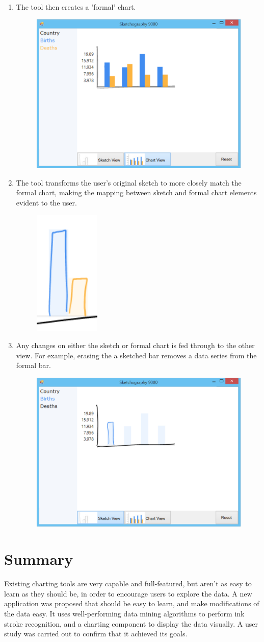 \begin{enumerate}
\begin{figure}[H]
	\end{figure}
\item The tool then creates a 'formal' chart.
	\begin{figure}[H]
	\centering
	\includegraphics[width=0.6\linewidth]{walk4}
	\end{figure}
\item The tool transforms the user's original sketch to more closely match the formal chart, making the mapping between sketch and formal chart elements evident to the user.
	\begin{figure}[H]
	\centering
	\includegraphics[width=0.1\linewidth]{walk5}
	\end{figure}
\item Any changes on either the sketch or formal chart is fed through to the other view. For example, erasing the a sketched bar removes a data series from the formal bar.
	\begin{figure}[H]
	\centering
	\includegraphics[width=0.6\linewidth]{walk6}
	\end{figure}
\end{enumerate}

\section{Summary}
Existing charting tools are very capable and full-featured, but aren't as easy to learn as they should be, in order to encourage users to explore the data. A new application was proposed that should be easy to learn, and make modifications of the data easy. It uses well-performing data mining algorithms to perform ink stroke recognition, and a charting component to display the data visually. A user study was carried out to confirm that it achieved its goals.

